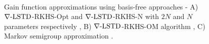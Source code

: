 \begin{figure}[htbp]
	\centering
	\mbox{
	}
	\mbox{
	}
	\mbox{
	} 
	\caption[Performance comparison of $\gradTD$-RKHS algorithms with a Gaussian kernel]{Gain function approximations using basis-free approaches - A) $\gradTD$-RKHS-Opt and $\gradTD$-RKHS-N with $2N$ and $N$ parameters respectively \cite{radmey18a}, B) $\gradTD$-RKHS-OM algorithm \cite{radmey19}, C) Markov semigroup approximation \cite{tagmeh16}.}
	\label{fig:diff_td_rkhs_coif}
\end{figure}
